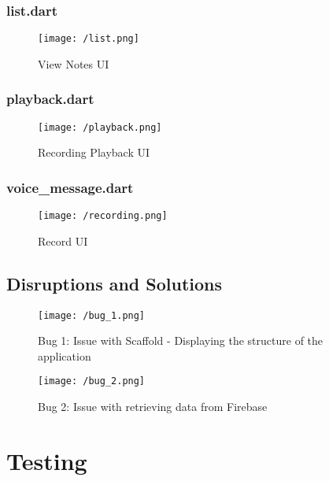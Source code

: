 \documentclass{report}
\begin{document}
		\subsection{list.dart}
		\begin{figure}[H]
			\begin{center}
	 		 	\texttt{[image: /list.png]}
			\end{center}
			\caption[View Notes UI]{View Notes UI}
		\end{figure}

		\subsection{playback.dart}
		\begin{figure}[H]
			\begin{center}
	 		 	\texttt{[image: /playback.png]}
			\end{center}
			\caption[Recording Playback UI]{Recording Playback UI}
		\end{figure}

		\subsection{voice\_message.dart}
		\begin{figure}[H]
			\begin{center}
	 		 	\texttt{[image: /recording.png]}
			\end{center}
			\caption[Record UI]{Record UI}
		\end{figure}

	\section{Disruptions and Solutions}
	\begin{center}
		\begin{figure}[H]
			\texttt{[image: /bug\_1.png]}
			\caption{Bug 1: Issue with Scaffold - Displaying the structure of the application}
		\end{figure}
		\begin{figure}[H]
			\texttt{[image: /bug\_2.png]}
			\caption{Bug 2: Issue with retrieving data from Firebase}
		\end{figure}
	\end{center}

\chapter{Testing}
\end{document}
